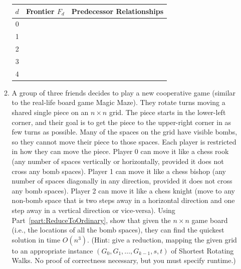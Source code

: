 \documentclass[11pt]{article}
\begin{document}
\begin{enumerate}
\begin{enumerate}
            \begin{table}[ht]
        \centering
        \begin{tabular}{c|c|c}
            $d$ & Frontier $F_d$& Predecessor Relationships \\
            \hline
              0 &  & \\
              1 &  & \\
              2 &  & \\
              3 &  & \\
              4 &  & \\
        \end{tabular}
        \end{table}




    
    \item 
        A group of three friends decides to play a new cooperative game (similar to the real-life board game Magic Maze).  They rotate turns moving a shared single piece on an $n\times n$ grid.  The piece starts in the lower-left corner, and their goal is to get the piece to the upper-right corner in as few turns as possible.  Many of the spaces on the grid have visible bombs, so they cannot move their piece to those spaces.  Each player is restricted in how they can move the piece.  Player 0 can move it like a chess rook (any number of spaces vertically or horizontally, provided it does not cross any bomb spaces). Player 1 can move it like a chess bishop (any number of spaces diagonally in any direction, provided it does not cross any bomb spaces).  Player 2 can move it like a chess knight (move to any non-bomb space that is two steps away in a horizontal direction and one step away in a vertical direction or vice-versa).   Using Part~\ref{part:ReduceToOrdinary}, show that given the $n\times n$ game board (i.e., the locations of all the bomb spaces), they can find the quickest solution in time $O(n^3)$.  
        (Hint: give a reduction, mapping the given grid to an appropriate instance $(G_0,G_1,\ldots,G_{k-1},s,t)$ of Shortest Rotating Walks. No proof of correctness necessary, but you must specify runtime.)


 



 \end{enumerate}


\end{enumerate}
\end{document}
